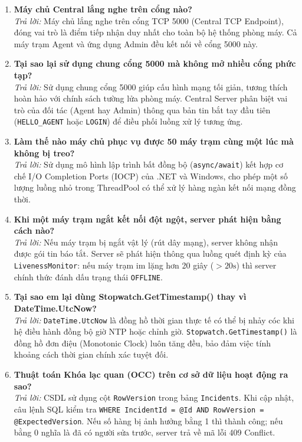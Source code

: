 \documentclass[12pt,a4paper]{article}
\begin{document}
\begin{enumerate}[leftmargin=*, label=\textbf{Câu \arabic*:}]
  \item \textbf{Máy chủ Central lắng nghe trên cổng nào?} \\
    \textit{Trả lời:} Máy chủ lắng nghe trên cổng TCP 5000 (Central TCP Endpoint), đóng vai trò là điểm tiếp nhận duy nhất cho toàn bộ hệ thống phòng máy. Cả máy trạm Agent và ứng dụng Admin đều kết nối về cổng 5000 này.
  \item \textbf{Tại sao lại sử dụng chung cổng 5000 mà không mở nhiều cổng phức tạp?} \\
    \textit{Trả lời:} Sử dụng chung cổng 5000 giúp cấu hình mạng tối giản, tương thích hoàn hảo với chính sách tường lửa phòng máy. Central Server phân biệt vai trò của đối tác (Agent hay Admin) thông qua bản tin bắt tay đầu tiên (\texttt{HELLO\_AGENT} hoặc \texttt{LOGIN}) để điều phối luồng xử lý tương ứng.
  \item \textbf{Làm thế nào máy chủ phục vụ được 50 máy trạm cùng một lúc mà không bị treo?} \\
    \textit{Trả lời:} Sử dụng mô hình lập trình bất đồng bộ (\texttt{async/await}) kết hợp cơ chế I/O Completion Ports (IOCP) của .NET và Windows, cho phép một số lượng luồng nhỏ trong ThreadPool có thể xử lý hàng ngàn kết nối mạng đồng thời.
  \item \textbf{Khi một máy trạm ngắt kết nối đột ngột, server phát hiện bằng cách nào?} \\
    \textit{Trả lời:} Nếu máy trạm bị ngắt vật lý (rút dây mạng), server không nhận được gói tin báo tắt. Server sẽ phát hiện thông qua luồng quét định kỳ của \texttt{LivenessMonitor}: nếu máy trạm im lặng hơn 20 giây ($> 20\text{s}$) thì server chính thức đánh dấu trạng thái \texttt{OFFLINE}.
  \item \textbf{Tại sao em lại dùng Stopwatch.GetTimestamp() thay vì DateTime.UtcNow?} \\
    \textit{Trả lời:} \texttt{DateTime.UtcNow} là đồng hồ thời gian thực tế có thể bị nhảy cóc khi hệ điều hành đồng bộ giờ NTP hoặc chỉnh giờ. \texttt{Stopwatch.GetTimestamp()} là đồng hồ đơn điệu (Monotonic Clock) luôn tăng đều, bảo đảm việc tính khoảng cách thời gian chính xác tuyệt đối.
  \item \textbf{Thuật toán Khóa lạc quan (OCC) trên cơ sở dữ liệu hoạt động ra sao?} \\
    \textit{Trả lời:} CSDL sử dụng cột \texttt{RowVersion} trong bảng \texttt{Incidents}. Khi cập nhật, câu lệnh SQL kiểm tra \texttt{WHERE IncidentId = @Id AND RowVersion = @ExpectedVersion}. Nếu số hàng bị ảnh hưởng bằng 1 thì thành công; nếu bằng 0 nghĩa là đã có người sửa trước, server trả về mã lỗi 409 Conflict.

\end{enumerate}
\end{document}

